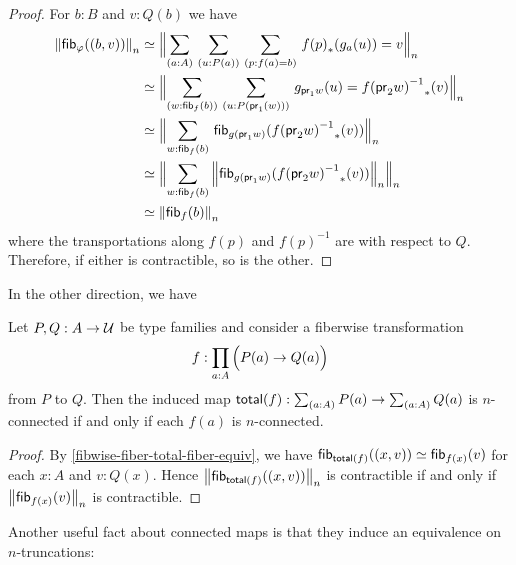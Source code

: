 \begin{proof}
For $b:B$ and $v:Q(b)$ we have
\begin{align*}
\trunc n{\hfib{\varphi}{\pairr{b,v}}} & \eqvsym \Trunc n{\sm{a:A}{u:P(a)}{p:f(a)= b} \trans{\ap f p }{g_a(u)}= v}\\
& \eqvsym \Trunc n{\sm{w:\hfib{f}b}{u:P(\proj1(w))} g_{\proj 1 w}(u)= \trans{\opp{\ap f {\proj2 w}}}{v}}\\
& \eqvsym \Trunc n{\sm{w:\hfib{f}b} \hfib{g(\proj1 w)}{\trans{\opp{\ap f {\proj 2 w}}}{v}}}\\
& \eqvsym \Trunc n{\sm{w:\hfib{f}b} \trunc n{\hfib{g(\proj1 w)}{\trans{\opp{\ap f {\proj 2 w}}}{v}}}}\\
& \eqvsym \trunc n{\hfib{f}b}
\end{align*}
where the transportations along $f(p)$ and $f(p)^{-1}$ are with respect to $Q$.
Therefore, if either is contractible, so is the other.
\end{proof}

In the other direction, we have

\begin{lem}\label{prop:nconn_fiber_to_total}
Let $P,Q:A\to\type$ be type families and consider a fiberwise transformation
\begin{equation*}
f:\prd{a:A} \Parens{P(a)\to Q(a)}
\end{equation*}
from $P$ to $Q$. Then the induced map $\total f: \sm{a:A}P(a) \to \sm{a:A} Q(a)$ is $n$-connected if and only if each $f(a)$ is $n$-connected. 
\end{lem}

\begin{proof}
By \autoref{fibwise-fiber-total-fiber-equiv}, we have
$\hfib{\total f}{\pairr{x,v}}\eqvsym\hfib{f(x)}v$
for each $x:A$ and $v:Q(x)$. Hence $\trunc n{\hfib{\total f}{\pairr{x,v}}}$ is contractible if and only if
$\trunc n{\hfib{f(x)}v}$ is contractible.
\end{proof}

Another useful fact about connected maps is that they induce an
equivalence on $n$-truncations:

